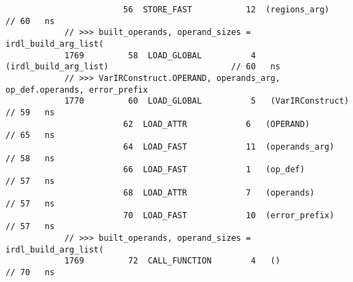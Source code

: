\begin{code}
\begin{verbatim}
                        56  STORE_FAST           12  (regions_arg)                                  // 60   ns
            // >>> built_operands, operand_sizes = irdl_build_arg_list(
            1769         58  LOAD_GLOBAL          4   (irdl_build_arg_list)                         // 60   ns
            // >>> VarIRConstruct.OPERAND, operands_arg, op_def.operands, error_prefix
            1770         60  LOAD_GLOBAL          5   (VarIRConstruct)                              // 59   ns
                        62  LOAD_ATTR            6   (OPERAND)                                      // 65   ns
                        64  LOAD_FAST            11  (operands_arg)                                 // 58   ns
                        66  LOAD_FAST            1   (op_def)                                       // 57   ns
                        68  LOAD_ATTR            7   (operands)                                     // 57   ns
                        70  LOAD_FAST            10  (error_prefix)                                 // 57   ns
            // >>> built_operands, operand_sizes = irdl_build_arg_list(
            1769         72  CALL_FUNCTION        4   ()                                            // 70   ns


\end{verbatim}
\end{code}
